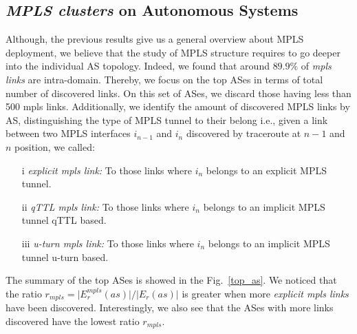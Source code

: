 \subsection{\textit{MPLS clusters} on Autonomous Systems}\label{cluster.as}
Although, the previous results give us a general overview about MPLS deployment,
we believe that the study of MPLS structure requires to go deeper into the
individual AS topology. Indeed, we found that around $89.9\%$ of \textit{mpls
links} are intra-domain. Thereby, we focus on the top ASes in terms of total
number of discovered links.  On this set of ASes, we discard those having less
than 500 mpls links. Additionally, we identify the amount of discovered MPLS
links by AS, distinguishing the type of MPLS tunnel to their belong i.e., given
a link between two MPLS interfaces $i_{n-1}$  and $i_{n}$ discovered by 
traceroute at $n-1$ and $n$ position, we called:

\begin{itemize}
  \item[i] \textit{explicit mpls link:} To those links 
  where $i_{n}$ belongs  to an explicit MPLS tunnel.
  \item[ii] \textit{qTTL mpls link:} To those links 
  where $i_{n}$ belongs  to an implicit MPLS tunnel qTTL based.
  \item[iii] \textit{u-turn mpls link:} To those links 
  where $i_{n}$ belongs  to an implicit MPLS tunnel u-turn based.
\end{itemize}

The summary of the top ASes is showed in the Fig.~\ref{top_as}.
We noticed that the ratio $r_{mpls}= \vert E^{mpls}_{r} (as) \vert /\vert E_{r}
(as) \vert $  is greater when more  \textit{explicit mpls links} have been
discovered. Interestingly, we also see that the ASes with more links discovered
have the lowest ratio $r_{mpls}$.

